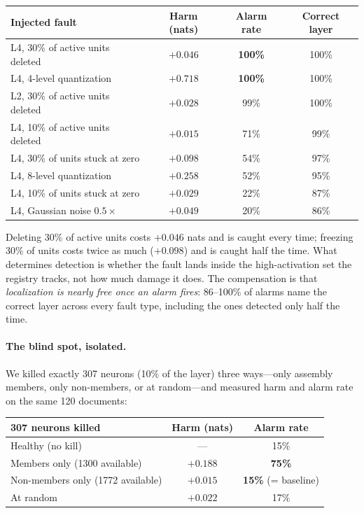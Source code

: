 \documentclass[11pt]{article}
\begin{document}
\begin{center}
\small
\setlength{\tabcolsep}{5pt}
\begin{tabular}{@{}lccc@{}}
\toprule
Injected fault & Harm (nats) & Alarm rate & Correct layer \\
\midrule
L4, 30\% of active units deleted & $+0.046$ & \textbf{100\%} & 100\% \\
L4, 4-level quantization & $+0.718$ & \textbf{100\%} & 100\% \\
L2, 30\% of active units deleted & $+0.028$ & 99\% & 100\% \\
L4, 10\% of active units deleted & $+0.015$ & 71\% & 99\% \\
L4, 30\% of units stuck at zero & $+0.098$ & 54\% & 97\% \\
L4, 8-level quantization & $+0.258$ & 52\% & 95\% \\
L4, 10\% of units stuck at zero & $+0.029$ & 22\% & 87\% \\
L4, Gaussian noise $0.5\times$ & $+0.049$ & 20\% & 86\% \\
\bottomrule
\end{tabular}
\end{center}

Deleting 30\% of active units costs $+0.046$ nats and is caught every time;
freezing 30\% of units costs twice as much ($+0.098$) and is caught half the
time. What determines detection is whether the fault lands inside the
high-activation set the registry tracks, not how much damage it does. The
compensation is that \emph{localization is nearly free once an alarm fires}:
86--100\% of alarms name the correct layer across every fault type, including
the ones detected only half the time.

\paragraph{The blind spot, isolated.} We killed exactly 307 neurons (10\% of
the layer) three ways---only assembly members, only non-members, or at
random---and measured harm and alarm rate on the same 120 documents:

\begin{center}
\small
\setlength{\tabcolsep}{6pt}
\begin{tabular}{@{}lcc@{}}
\toprule
307 neurons killed & Harm (nats) & Alarm rate \\
\midrule
Healthy (no kill) & --- & 15\% \\
Members only (1300 available) & $+0.188$ & \textbf{75\%} \\
Non-members only (1772 available) & $+0.015$ & \textbf{15\%} (= baseline) \\
At random & $+0.022$ & 17\% \\
\bottomrule
\end{tabular}
\end{center}
\end{document}

